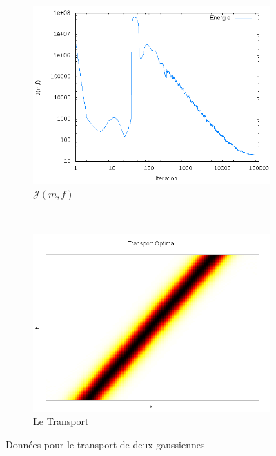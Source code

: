 \documentclass{beamer}
\begin{document}
\begin{frame}
\begin{figure}[!h]
	\begin{subfigure}[b]{0.48\linewidth}
	\includegraphics[width=\textwidth]{img/1DGaussian100x100/energie.png}
	\caption{$\mathcal{J}(m,f)$}
	\end{subfigure}
	~
	\begin{subfigure}[b]{0.48\linewidth}
	\includegraphics[width=\textwidth]{img/1DGaussian100x100/transport.png}
	\caption{Le Transport}
	\end{subfigure}	
	\caption{Données pour le transport de deux gaussiennes}
\end{figure}
\end{frame}
\end{document}

